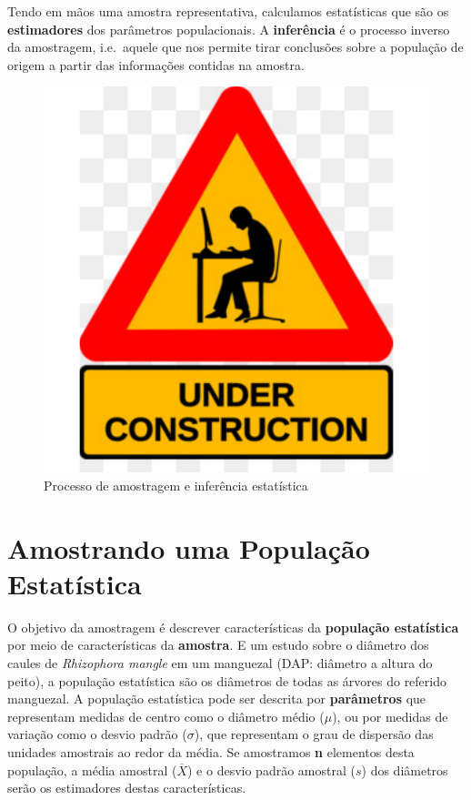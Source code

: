 \documentclass[
]{book}
\begin{document}
Tendo em mãos uma amostra representativa, calculamos estatísticas que são os \textbf{estimadores} dos parâmetros populacionais. A \textbf{inferência} é o processo inverso da amostragem, i.e.~aquele que nos permite tirar conclusões sobre a população de origem a partir das informações contidas na amostra.

\begin{figure}

{\centering \includegraphics[width=18in]{probest-cambientais_files/figure-latex/unnamed-chunk-168-1} 

}

\caption{Processo de amostragem e inferência estatística}\label{fig:unnamed-chunk-168}
\end{figure}

\hypertarget{amostrmedias}{%
\chapter{Amostrando uma População Estatística}\label{amostrmedias}}

O objetivo da amostragem é descrever características da \textbf{população estatística} por meio de características da \textbf{amostra}. E um estudo sobre o diâmetro dos caules de \emph{Rhizophora mangle} em um manguezal (DAP: diâmetro a altura do peito), a população estatística são os diâmetros de todas as árvores do referido manguezal. A população estatística pode ser descrita por \textbf{parâmetros} que representam medidas de centro como o diâmetro médio (\(\mu\)), ou por medidas de variação como o desvio padrão (\(\sigma\)), que representam o grau de dispersão das unidades amostrais ao redor da média. Se amostramos \textbf{n} elementos desta população, a média amostral (\(\overline{X}\)) e o desvio padrão amostral (\(s\)) dos diâmetros serão os estimadores destas características.
\end{document}
